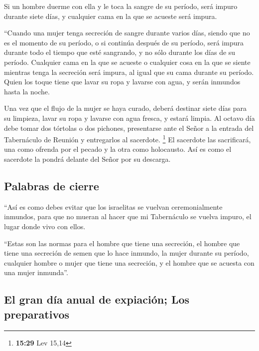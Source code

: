  Si un hombre duerme con ella y le toca la sangre de su
período, será impuro durante siete días, y cualquier cama en la que se
acueste será impura.

 ``Cuando una mujer tenga secreción de sangre durante
varios días, siendo que no es el momento de su período, o si continúa
después de su período, será impura durante todo el tiempo que esté
sangrando, y no sólo durante los días de su período. 
Cualquier cama en la que se acueste o cualquier cosa en la que se siente
mientras tenga la secreción será impura, al igual que su cama durante su
período.  Quien los toque tiene que lavar su ropa y
lavarse con agua, y serán inmundos hasta la noche.

 Una vez que el flujo de la mujer se haya curado, deberá
destinar siete días para su limpieza, lavar su ropa y lavarse con agua
fresca, y estará limpia.  Al octavo día debe tomar dos
tórtolas o dos pichones, presentarse ante el Señor a la entrada del
Tabernáculo de Reunión y entregarlos al sacerdote. \footnote{\textbf{15:29}
  Lev 15,14}  El sacerdote las sacrificará, una como
ofrenda por el pecado y la otra como holocausto. Así es como el
sacerdote la pondrá delante del Señor por su descarga.

\hypertarget{palabras-de-cierre}{%
\subsection{Palabras de cierre}\label{palabras-de-cierre}}

 ``Así es como debes evitar que los israelitas se vuelvan
ceremonialmente inmundos, para que no mueran al hacer que mi Tabernáculo
se vuelva impuro, el lugar donde vivo con ellos.

 ``Estas son las normas para el hombre que tiene una
secreción, el hombre que tiene una secreción de semen que lo hace
inmundo,  la mujer durante su período, cualquier hombre o
mujer que tiene una secreción, y el hombre que se acuesta con una mujer
inmunda''.

\hypertarget{el-gran-duxeda-anual-de-expiaciuxf3n-los-preparativos}{%
\subsection{El gran día anual de expiación; Los
preparativos}\label{el-gran-duxeda-anual-de-expiaciuxf3n-los-preparativos}}

